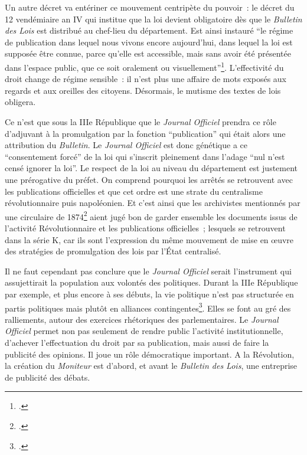 Un autre décret va entériner ce mouvement centripète du pouvoir : le décret du 12 vendémiaire an IV qui institue que la loi devient obligatoire dès que le \emph{Bulletin des Lois} est distribué au chef-lieu du département. Est ainsi instauré \enquote{le régime de publication dans lequel nous vivons encore aujourd’hui, dans  lequel la loi est supposée être connue, parce qu’elle est accessible, mais sans avoir été présentée dans l’espace public, que ce soit oralement ou visuellement}\footcite[][]{graber}. L’effectivité du droit change de régime sensible : il n’est plus une affaire de mots exposés aux regards  et aux oreilles des citoyens. Désormais, le mutisme des textes de lois obligera.

Ce n’est que sous la IIIe République que le \emph{Journal Officiel} prendra ce rôle d’adjuvant à la promulgation par la fonction \enquote{publication} qui était alors une attribution du \emph{Bulletin}. Le \emph{Journal Officiel} est donc génétique a ce \enquote{consentement forcé} de la loi qui s’inscrit pleinement dans l’adage \enquote{nul n’est censé ignorer la loi}. Le respect de la loi au niveau du département est justement une prérogative du préfet. On comprend pourquoi  les arrêtés se retrouvent avec les publications officielles et que cet ordre est une strate du centralisme révolutionnaire puis napoléonien. Et c’est ainsi que les archivistes mentionnés par une circulaire de 1874\footcite[][]{circulaire} aient jugé bon de garder ensemble les documents issus de l’activité Révolutionnaire et les publications officielles ; lesquels se retrouvent dans la série K, car ils sont l’expression du même mouvement de mise en œuvre des stratégies de promulgation des lois par l’État centralisé.

Il ne faut cependant pas conclure que le \emph{Journal Officiel} serait l’instrument qui assujettirait la population aux volontés des politiques. Durant la IIIe République par exemple, et plus encore à ses débuts, la vie politique n’est pas structurée en partis politiques mais plutôt en alliances contingentes\footcite[][]{morelcr}. Elles se font au gré des ralliements, autour des exercices rhétoriques des parlementaires. Le \emph{Journal Officiel} permet non pas seulement de rendre public l’activité institutionnelle, d’achever l’effectuation du droit par sa publication, mais aussi de faire la publicité des opinions. Il joue un rôle démocratique important. A la Révolution, la création du \emph{Moniteur} est d’abord, et avant le \emph{Bulletin des Lois}, une entreprise de publicité des débats.

